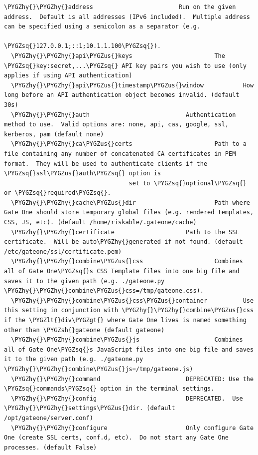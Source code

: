 \documentclass[letterpaper,10pt,openany]{sphinxmanual}
\def\PYGZus{\char`\_}
\def\PYGZlt{\char`\<}
\def\PYGZgt{\char`\>}
\def\PYGZsh{\char`\#}
\def\PYGZhy{\char`\-}
\def\PYGZsq{\char`\'}
\begin{document}
\begin{Verbatim}[commandchars=\\\{\}]
  \PYGZhy{}\PYGZhy{}address                        Run on the given address.  Default is all addresses (IPv6 included).  Multiple address can be specified using a semicolon as a separator (e.g.
                                   \PYGZsq{}127.0.0.1;::1;10.1.1.100\PYGZsq{}).
  \PYGZhy{}\PYGZhy{}api\PYGZus{}keys                       The \PYGZsq{}key:secret,...\PYGZsq{} API key pairs you wish to use (only applies if using API authentication)
  \PYGZhy{}\PYGZhy{}api\PYGZus{}timestamp\PYGZus{}window           How long before an API authentication object becomes invalid. (default 30s)
  \PYGZhy{}\PYGZhy{}auth                           Authentication method to use.  Valid options are: none, api, cas, google, ssl, kerberos, pam (default none)
  \PYGZhy{}\PYGZhy{}ca\PYGZus{}certs                       Path to a file containing any number of concatenated CA certificates in PEM format.  They will be used to authenticate clients if the \PYGZsq{}ssl\PYGZus{}auth\PYGZsq{} option is
                                   set to \PYGZsq{}optional\PYGZsq{} or \PYGZsq{}required\PYGZsq{}.
  \PYGZhy{}\PYGZhy{}cache\PYGZus{}dir                      Path where Gate One should store temporary global files (e.g. rendered templates, CSS, JS, etc). (default /home/riskable/.gateone/cache)
  \PYGZhy{}\PYGZhy{}certificate                    Path to the SSL certificate.  Will be auto\PYGZhy{}generated if not found. (default /etc/gateone/ssl/certificate.pem)
  \PYGZhy{}\PYGZhy{}combine\PYGZus{}css                    Combines all of Gate One\PYGZsq{}s CSS Template files into one big file and saves it to the given path (e.g. ./gateone.py \PYGZhy{}\PYGZhy{}combine\PYGZus{}css=/tmp/gateone.css).
  \PYGZhy{}\PYGZhy{}combine\PYGZus{}css\PYGZus{}container          Use this setting in conjunction with \PYGZhy{}\PYGZhy{}combine\PYGZus{}css if the \PYGZlt{}div\PYGZgt{} where Gate One lives is named something other than \PYGZsh{}gateone (default gateone)
  \PYGZhy{}\PYGZhy{}combine\PYGZus{}js                     Combines all of Gate One\PYGZsq{}s JavaScript files into one big file and saves it to the given path (e.g. ./gateone.py \PYGZhy{}\PYGZhy{}combine\PYGZus{}js=/tmp/gateone.js)
  \PYGZhy{}\PYGZhy{}command                        DEPRECATED: Use the \PYGZsq{}commands\PYGZsq{} option in the terminal settings.
  \PYGZhy{}\PYGZhy{}config                         DEPRECATED.  Use \PYGZhy{}\PYGZhy{}settings\PYGZus{}dir. (default /opt/gateone/server.conf)
  \PYGZhy{}\PYGZhy{}configure                      Only configure Gate One (create SSL certs, conf.d, etc).  Do not start any Gate One processes. (default False)

\end{Verbatim}
\end{document}
